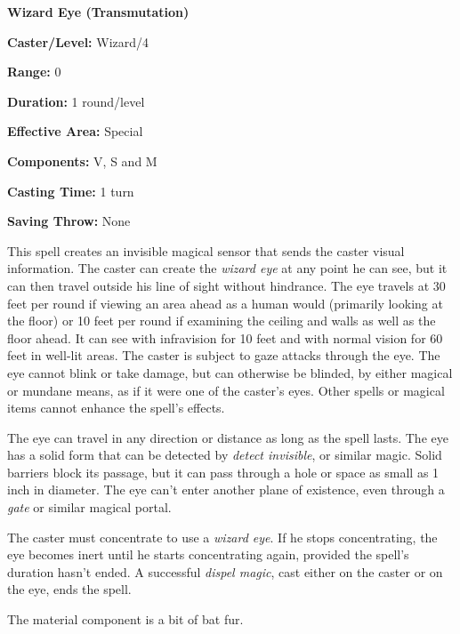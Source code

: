 \begin{multicols}{2}
\vspace{1em}

\noindent
\begin{minipage}{\columnwidth}

\noindent \textbf{Wizard Eye (Transmutation)}

\noindent \textbf{Caster/Level:} Wizard/4

\noindent \textbf{Range:} 0

\noindent \textbf{Duration:} 1 round/level

\noindent \textbf{Effective Area:} Special

\noindent \textbf{Components:} V, S and M

\noindent \textbf{Casting Time:} 1 turn

\noindent \textbf{Saving Throw:} None

\end{minipage}

This spell creates an invisible magical sensor that sends the caster visual information.  The caster can create the \textit{wizard eye} at any point he can see, but it can then travel outside his line of sight without hindrance.  The eye travels at 30 feet per round if viewing an area ahead as a human would (primarily looking at the floor) or 10 feet per round if examining the ceiling and walls as well as the floor ahead.  It can see with infravision for 10 feet and with normal vision for 60 feet in well-lit areas.  The caster is subject to gaze attacks through the eye.  The eye cannot blink or take damage, but can otherwise be blinded, by either magical or mundane means, as if it were one of the caster's eyes.  Other spells or magical items cannot enhance the spell's effects.  

The eye can travel in any direction or distance as long as the spell lasts.  The eye has a solid form that can be detected by \textit{detect invisible}, or similar magic.  Solid barriers block its passage, but it can pass through a hole or space as small as 1 inch in diameter.  The eye can't enter another plane of existence, even through a \textit{gate} or similar magical portal. 

The caster must concentrate to use a \textit{wizard eye}.  If he stops concentrating, the eye becomes inert until he starts concentrating again, provided the spell's duration hasn't ended.  A successful \textit{dispel magic}, cast either on the caster or on the eye, ends the spell.

The material component is a bit of bat fur.


\end{multicols}
